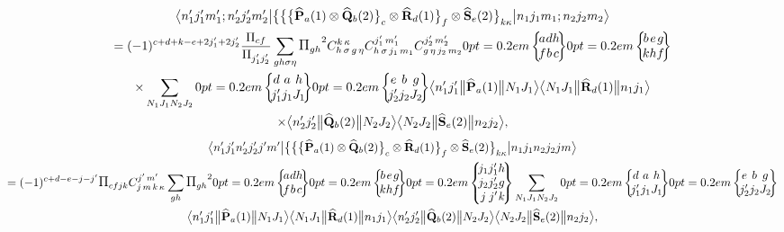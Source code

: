 \begin{multline} 
\braOket{ n_{1}^{\prime} j_{1}^{\prime} m_{1}^{\prime} ; n_{2}^{\prime} j_{2}^{\prime} m_{2}^{\prime}}{\bigl\{\bigl\{\bigl\{\widehat{\vect{P}}_{a}(1) \otimes \widehat{\vect{Q}}_{b}(2)\bigr\}_{c} \otimes \widehat{\vect{R}}_{d}(1)\bigr\}_{f} \otimes \widehat{\vect{S}}_{e}(2)\bigr\}_{k \kappa}}{n_{1} j_{1} m_{1} ; n_{2} j_{2} m_{2}} \\
 =(-1)^{c+d+k-e+2 j_{1}^{\prime}+2 j_{2}^{\prime}} \frac{\Fact{c f}}{\Fact{j_{1}^{\prime} j_{2}^{\prime}}} \sum_{g h \sigma \eta} \Fact{g h}^{2} 
\clebsch{h}{\sigma}{g}{\eta}{k}{\kappa} 
\clebsch{h}{\sigma}{j_{1}}{m_{1}}{j_{1}^{\prime}}{m_{1}^{\prime}} 
\clebsch{g}{\eta}{j_{2}}{m_{2}}{j_{2}^{\prime}}{m_{2}^{\prime}}
\sixj{a}{d}{h}{f}{b}{c}
\sixj{b}{e}{g}{k}{h}{f} \\
 \times \sum_{N_{1} J_{1} N_{2} J_{2}}
\sixj{d}{a}{h}{j_{1}^{\prime}}{j_{1}}{J_{1}}
\sixj{e}{b}{g}{j_{2}^{\prime}}{j_{2}}{J_{2}}
\braOketred{ n_{1}^{\prime} j_{1}^{\prime}}{\widehat{\vect{P}}_{a}(1)}{ N_{1} J_{1}}
\braOketred{ N_{1} J_{1}}{\widehat{\vect{R}}_{d}(1)}{ n_{1} j_{1}} \\
 \times
\braOketred{ n_{2}^{\prime} j_{2}^{\prime}}{\widehat{\vect{Q}}_{b}(2)}{ N_{2} J_{2}}
\braOketred{ N_{2} J_{2}}{\widehat{\vect{S}}_{e}(2)}{ n_{2} j_{2}},  \label{eq:13:1:36}
\end{multline}
\begin{multline} 
\braOket{ n_{1}^{\prime} j_{1}^{\prime} n_{2}^{\prime} j_{2}^{\prime} j^{\prime} m^{\prime}}{\bigl\{\bigl\{\bigl\{\widehat{\vect{P}}_{a}(1) \otimes \widehat{\vect{Q}}_{b}(2)\bigr\}_{c} \otimes \widehat{\vect{R}}_{d}(1)\bigr\}_{f} \otimes \widehat{\vect{S}}_{e}(2)\bigr\}_{k \kappa}}{n_{1} j_{1} n_{2} j_{2} j m} \\
 =(-1)^{c+d-e-j-j^{\prime}} \Fact{c f j k} 
\clebsch{j}{m}{k}{\kappa}{j^{\prime}}{m^{\prime}} \sum_{g h} \Fact{g h}^{2}
\sixj{a}{d}{h}{f}{b}{c}
\sixj{b}{e}{g}{k}{h}{f}
\ninej{j_{1}}{j_{1}^{\prime}}{h}{j_{2}}{j_{2}^{\prime}}{g}{j}{j^{\prime}}{k} \sum_{N_{1} J_{1} N_{2} J_{2}}
\sixj{d}{a}{h}{j_{1}^{\prime}}{j_{1}}{J_{1}}
\sixj{e}{b}{g}{j_{2}^{\prime}}{j_{2}}{J_{2}} \\
\braOketred{ n_{1}^{\prime} j_{1}^{\prime}}{\widehat{\vect{P}}_{a}(1)}{ N_{1} J_{1}}
\braOketred{ N_{1} J_{1}}{\widehat{\vect{R}}_{d}(1)}{ n_{1} j_{1}}
\braOketred{ n_{2}^{\prime} j_{2}^{\prime}}{\widehat{\vect{Q}}_{b}(2)}{ N_{2} J_{2}}
\braOketred{ N_{2} J_{2}}{\widehat{\vect{S}}_{e}(2)}{ n_{2} j_{2}},  \label{eq:13:1:37}
\end{multline}
